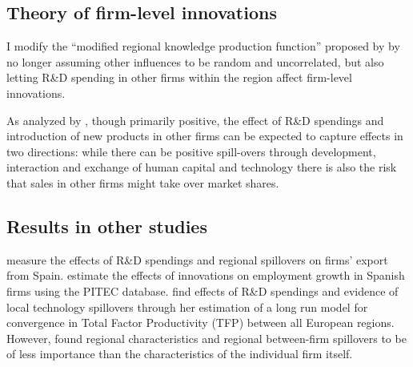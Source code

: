 \subsection{Theory of firm-level innovations}
\label{subsec:theory}
I modify the “modified regional knowledge production function” proposed by \citet{ohUallach2007rethinking} by no longer assuming other influences to be random and uncorrelated, but also letting R\&D spending in other firms within the region affect firm-level innovations.

As analyzed by \citet{harrison2014does}, though primarily positive, the effect of R\&D spendings and introduction of new products in other firms can be expected to capture effects in two directions: while there can be positive spill-overs through development, interaction and exchange of human capital and technology there is also the risk that sales in other firms might take over market shares.

\subsection{Results in other studies}
\label{subsec:other_studies}
\citet{barrios2001explaining} measure the effects of R\&D spendings and regional spillovers on firms' export from Spain. \citet{harrison2014does} estimate the effects of innovations on employment growth in Spanish firms using the PITEC database. \citet{vogel2015two} find effects of R\&D spendings and evidence of local technology spillovers through her estimation of a long run model for convergence in Total Factor Productivity (TFP) between all European regions. However, \citet{sternberg2001firm} found regional characteristics and regional between-firm spillovers to be of less importance than the characteristics of the individual firm itself.
